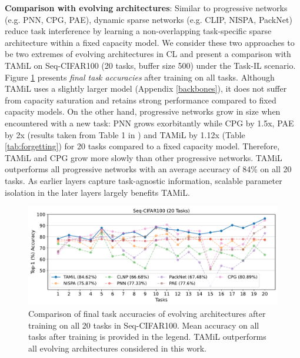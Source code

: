 \documentclass{article} %
\begin{document}
\vspace{.25in}
 
\textbf{Comparison with evolving architectures}\label{dynamic_sparse_comparison}:
Similar to progressive networks (e.g. PNN, CPG, PAE), dynamic sparse networks (e.g. CLIP, NISPA, PackNet) reduce task interference by learning a non-overlapping task-specific sparse architecture within a fixed capacity model. We consider these two approaches to be two extremes of evolving architectures in CL and present a comparison with TAMiL on Seq-CIFAR100 (20 tasks, buffer size 500) under the Task-IL scenario. Figure \ref{fig:nispa} presents \textit{final task accuracies} after training on all tasks.
Although TAMiL uses a slightly larger model (Appendix \ref{backbones}), it does not suffer from capacity saturation and retains strong performance compared to fixed capacity models.  On the other hand, progressive networks grow in size when encountered with a new task: PNN grows exorbitantly while CPG by 1.5x, PAE by 2x (results taken from Table 1 in \cite{hung2019compacting}) and TAMiL by 1.12x (Table \ref{tab:forgetting})  for 20 tasks compared to a fixed capacity model. Therefore, TAMiL and CPG grow more slowly than other progressive networks. TAMiL outperforms all progressive networks with an average accuracy of 84\% on all 20 tasks. As earlier layers capture task-agnostic information, scalable parameter isolation in the later layers largely benefits TAMiL.  

\begin{figure}[t]
  \centering
  \includegraphics[width=\linewidth]{images/nispa.pdf}
  \caption{ Comparison of final task accuracies of evolving architectures after training on all 20 tasks in Seq-CIFAR100. Mean accuracy on all tasks after training is provided in the legend. TAMiL outperforms all evolving architectures considered in this work.} 
  \label{fig:nispa}
\end{figure}
\end{document}
